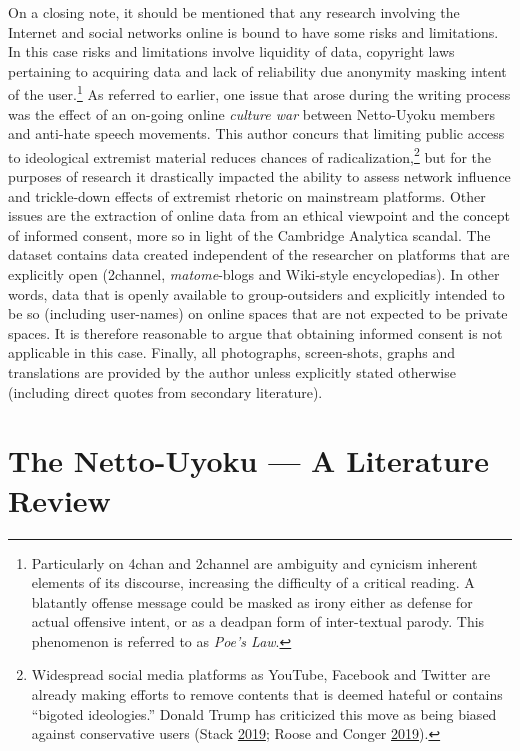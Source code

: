\documentclass[10pt,british,A4paper,oneside]{memoir}
\begin{document}
On a closing note, it should be mentioned that any research involving
the Internet and social networks online is bound to have some risks and
limitations. In this case risks and limitations involve liquidity of
data, copyright laws pertaining to acquiring data and lack of
reliability due anonymity masking intent of the user.\footnote{Particularly
  on 4chan and 2channel are ambiguity and cynicism inherent elements of its
  discourse, increasing the difficulty of a critical reading. A
  blatantly offense message could be masked as irony either as defense
  for actual offensive intent, or as a deadpan form of inter-textual
  parody. This phenomenon is referred to as \emph{Poe's Law}.} As
referred to earlier, one issue that arose during the writing process was
the effect of an on-going online \emph{culture war} between Netto-Uyoku
members and anti-hate speech movements. This author concurs that
limiting public access to ideological extremist material reduces chances
of radicalization,\footnote{Widespread social media platforms as
  YouTube, Facebook and Twitter are already making efforts to remove
  contents that is deemed hateful or contains ``bigoted ideologies.''
  Donald Trump has criticized this move as being biased against
  conservative users (Stack
  \protect\hyperlink{ref-stack_trump_2019}{2019}; Roose and Conger
  \protect\hyperlink{ref-roose_youtube_2019}{2019}).} but for the
purposes of research it drastically impacted the ability to assess
network influence and trickle-down effects of extremist rhetoric on
mainstream platforms. Other issues are the extraction of online data
from an ethical viewpoint and the concept of informed consent, more so
in light of the Cambridge Analytica scandal. The dataset contains data
created independent of the researcher on platforms that are explicitly
open (2channel, \emph{matome}-blogs and Wiki-style encyclopedias). In
other words, data that is openly available to group-outsiders and
explicitly intended to be so (including user-names) on online spaces
that are not expected to be private spaces. It is therefore reasonable
to argue that obtaining informed consent is not applicable in this case.
Finally, all photographs, screen-shots, graphs and translations are
provided by the author unless explicitly stated otherwise (including
direct quotes from secondary literature).

\newpage

\chapter{The Netto-Uyoku --- A Literature
Review}\label{the-netto-uyoku-a-literature-review}
\end{document}
